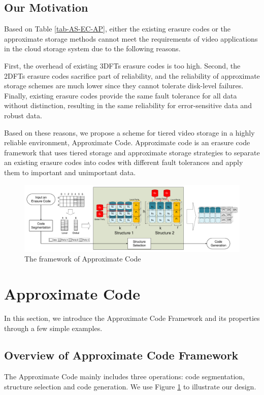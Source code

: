\documentclass[sigconf]{acmart}
\begin{document}
\subsection{Our Motivation}
Based on Table \ref{tab-AS-EC-AP}, either the existing erasure codes or the approximate storage methods cannot meet the requirements of video applications in the cloud storage system due to the following reasons. 

First, the overhead of existing 3DFTs erasure codes is too high.
Second, the 2DFTs erasure codes sacrifice part of reliability, and the reliability of approximate storage schemes are much lower since they cannot tolerate disk-level failures.
Finally, existing erasure codes provide the same fault tolerance for all data without distinction, resulting in the same reliability for error-sensitive data and robust data.

Based on these reasons, we propose a scheme for tiered video storage in a highly reliable environment, Approximate Code.
Approximate code is an erasure code framework that uses tiered storage\cite{krish2014hats} \cite{wang2014balancing} \cite{zhang2010automated} \cite{udipi2012lot} and approximate storage strategies to separate an existing erasure codes into codes with different fault tolerances and apply them to important and unimportant data.

\begin{figure}[ht!]
\centering
\includegraphics[width=\linewidth]{photo/Framework-v2.pdf}
\caption{The framework of Approximate Code}
\label{fig-framework}
\end{figure}

\section{Approximate Code}\label{ApCode}
In this section, we introduce the Approximate Code Framework and its properties through a few simple examples. 

\subsection{Overview of Approximate Code Framework}
The Approximate Code mainly includes three operations: code segmentation, structure selection and code generation. We use Figure \ref{fig-framework} to illustrate our design.
\end{document}

